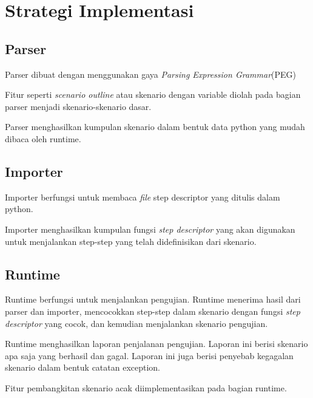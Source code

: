 \chapter{Strategi Implementasi}

\section{Parser}

Parser dibuat dengan menggunakan gaya \emph{Parsing Expression Grammar}(PEG)

Fitur seperti \emph{scenario outline} atau skenario dengan variable diolah pada bagian parser
menjadi skenario-skenario dasar.

Parser menghasilkan kumpulan skenario dalam bentuk data python yang mudah dibaca oleh runtime.

\section{Importer}

Importer berfungsi untuk membaca \emph{file} step descriptor yang ditulis dalam python.

Importer menghasilkan kumpulan fungsi \emph{step descriptor} yang akan digunakan untuk
menjalankan step-step yang telah didefinisikan dari skenario.

\section{Runtime}

Runtime berfungsi untuk menjalankan pengujian. Runtime menerima hasil dari parser dan importer,
mencocokkan step-step dalam skenario dengan fungsi \emph{step descriptor} yang cocok,
dan kemudian menjalankan skenario pengujian.

Runtime menghasilkan laporan penjalanan pengujian. Laporan ini berisi skenario apa saja
yang berhasil dan gagal. Laporan ini juga berisi penyebab kegagalan skenario dalam
bentuk catatan exception.

Fitur pembangkitan skenario acak diimplementasikan pada bagian runtime.